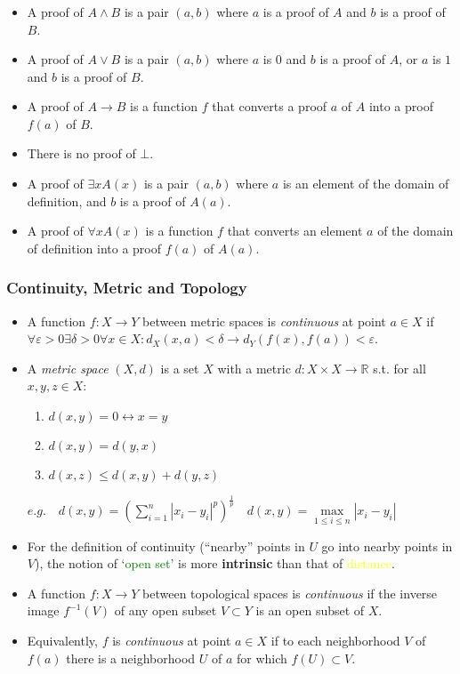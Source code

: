 \documentclass[UTF8,11pt,colorlinks,compress,openany]{beamer}%
\begin{document}
\begin{frame}\frametitle{\hyperlink{curry-howard}{}}
\label{bhk}
\begin{itemize}
	\item A proof of $A\wedge B$ is a pair $(a,b)$ where $a$ is a proof of $A$ and $b$ is a proof of $B$.
	\item A proof of $A\vee B$ is a pair $(a,b)$ where $a$ is $0$ and $b$ is a proof of $A$, or $a$ is $1$ and $b$ is a proof of $B$.
	\item A proof of $A\to B$ is a function $f$ that converts a proof $a$ of $A$ into a proof $f(a)$ of $B$.
	\item There is no proof of $\bot$.
	\item A proof of $\exists x A(x)$ is a pair $(a,b)$ where $a$ is an element of the domain of definition, and $b$ is a proof of $A(a)$.
	\item A proof of $\forall x A(x)$ is a function $f$ that converts an element $a$ of the domain of definition into a proof $f(a)$ of $A(a)$.
\end{itemize}
\end{frame}

\begin{frame}\frametitle{Continuity, Metric and Topology}
\begin{itemize}
	\item A function $f: X\to Y$ between metric spaces is \emph{continuous} at point $a\in X$ if $\forall\varepsilon>0\exists\delta>0\forall x\in X: d_X(x,a)<\delta\to d_Y(f(x),f(a))<\varepsilon$.
	\item A \emph{metric space} $(X,d)$ is a set $X$ with a metric $d:X\times X\to \mathbb{R}$ s.t. for all $x,y,z\in X$:
\begin{enumerate}
	\item $d(x,y)=0\leftrightarrow x=y$
	\item $d(x,y)=d(y,x)$
	\item $d(x,z)\leq d(x,y)+d(y,z)$
\end{enumerate}
$e.g.\quad d(x,y)=\left(\sum\limits_{i=1}^n|x_i-y_i|^p\right)^{\frac{1}{p}}\quad d(x,y)=\max\limits_{1\leq i\leq n}|x_i-y_i|$
	\item For the definition of continuity (``nearby'' points in $U$ go into nearby points in $V$), the notion of `\textcolor{green}{open set}' is more \textbf{intrinsic} than that of \textcolor{yellow}{distance}.
	\item A function $f: X\to Y$ between topological spaces is \emph{continuous} if the inverse image $f^{-1}(V)$ of any open subset $V\subset Y$ is an open subset of $X$.
	\item Equivalently, $f$ is \emph{continuous} at point $a\in X$ if to each neighborhood $V$ of $f(a)$ there is a neighborhood $U$ of $a$ for which $f(U)\subset V$.
\end{itemize}
\end{frame}
\end{document}
